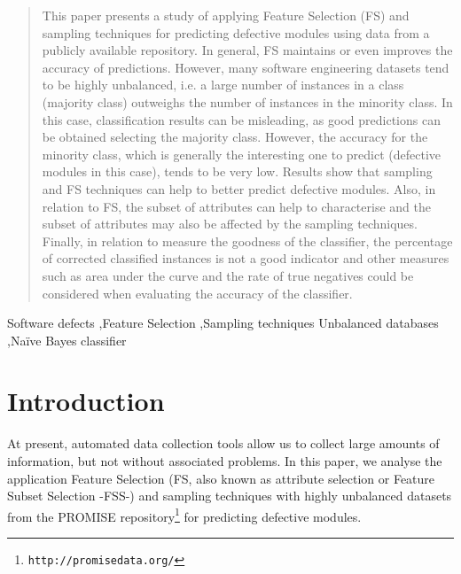\documentclass{elsart}
\begin{document}
\begin{frontmatter}
\begin{abstract}
This paper presents a study of applying Feature Selection (FS) and sampling techniques for predicting defective modules using data from a publicly available repository. In general, FS maintains or even improves the accuracy of predictions. However, many software engineering datasets tend to be highly unbalanced, i.e. a large number of instances in a class (majority class) outweighs the number of instances in the minority class. In this case, classification results can be misleading, as good predictions can be obtained selecting the majority class. However, the accuracy for the minority class, which is generally the interesting one to predict (defective modules in this case), tends to be very low. Results show that sampling and FS techniques can help to better predict defective modules. Also, in relation to FS, the subset of attributes can help to characterise and the subset of attributes may also be affected by the sampling techniques. Finally, in relation to measure the goodness of the classifier, the percentage of corrected classified instances is not a good indicator and other measures such as area under the curve and the rate of true negatives could be considered when evaluating the accuracy of the classifier.
\end{abstract}

\begin{keyword}
Software defects \sep Feature Selection \sep Sampling techniques
Unbalanced databases
 \sep Na\"ive Bayes classifier
\PACS
\end{keyword}


\end{frontmatter}



\section{Introduction}
\label{sec:intro}


At present, automated data collection tools allow us to collect large amounts of information, but not without associated problems.
In this paper, we analyse the application Feature Selection (FS, also known as attribute selection or Feature Subset Selection -FSS-) and sampling techniques with highly unbalanced datasets from the PROMISE repository\footnote{\texttt{http://promisedata.org/}}\cite{PROMISERep} for predicting defective modules.
\end{document}
